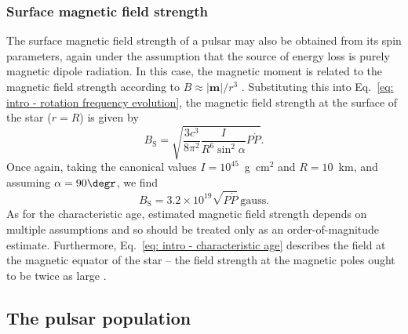 \subsubsection*{Surface magnetic field strength}
\label{sec: intro - general intro - spin parameters - surface B field}

The surface magnetic field strength of a pulsar may also be obtained from its spin parameters, again under the assumption that the source of energy loss is purely magnetic dipole radiation. In this case, the magnetic moment is related to the magnetic field strength according to $B\approx|\mathbf{m}|/r^3$ \citep[e.g.][]{Jxxx1962}. Substituting this into Eq.~\eqref{eq: intro - rotation frequency evolution}, the magnetic field strength at the surface of the star ($r=R$) is given by
\begin{equation}
    \label{eq: intro - pulsar field strength}
    B_\mathrm{S} = \sqrt{\frac{3c^3}{8\pi^2}\frac{I}{R^6 \sin^2\alpha}P\dot{P}}.
\end{equation}
Once again, taking the canonical values $I=10^{45}$~g~cm$^2$ and $R=10$~km, and assuming $\alpha = 90\degr$, we find
\begin{equation}
    \label{eq: intro - characteristic B field}
    B_\mathrm{S} = 3.2\times 10^{19} \sqrt{P\dot{P}} \mathrm{\ gauss}.
\end{equation}
As for the characteristic age, estimated magnetic field strength depends on multiple assumptions and so should be treated only as an order-of-magnitude estimate. Furthermore, Eq.~\eqref{eq: intro - characteristic age} describes the field at the magnetic equator of the star -- the field strength at the magnetic poles ought to be twice as large \citep{STxx1983,UMxx1995}.




















\subsection{The pulsar population}
\label{sec: intro - general intro - pulsar population}

